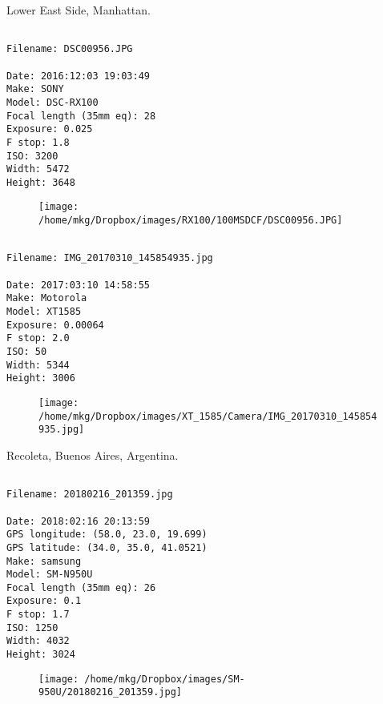 \clearpage
\onecolumn
\noindent Lower East Side, Manhattan.
\noindent
\begin{lstlisting}

Filename: DSC00956.JPG

Date: 2016:12:03 19:03:49
Make: SONY
Model: DSC-RX100
Focal length (35mm eq): 28
Exposure: 0.025
F stop: 1.8
ISO: 3200
Width: 5472
Height: 3648
\end{lstlisting}
\clearpage

\begin{figure}
\texttt{[image: /home/mkg/Dropbox/images/RX100/100MSDCF/DSC00956.JPG]}
\end{figure}
    
\clearpage
\onecolumn
\noindent 
\noindent
\begin{lstlisting}

Filename: IMG_20170310_145854935.jpg

Date: 2017:03:10 14:58:55
Make: Motorola
Model: XT1585
Exposure: 0.00064
F stop: 2.0
ISO: 50
Width: 5344
Height: 3006
\end{lstlisting}
\clearpage

\begin{figure}
\texttt{[image: /home/mkg/Dropbox/images/XT\_1585/Camera/IMG\_20170310\_145854935.jpg]}
\end{figure}
    
\clearpage
\onecolumn
\noindent Recoleta, Buenos Aires, Argentina.
\noindent
\begin{lstlisting}

Filename: 20180216_201359.jpg

Date: 2018:02:16 20:13:59
GPS longitude: (58.0, 23.0, 19.699)
GPS latitude: (34.0, 35.0, 41.0521)
Make: samsung
Model: SM-N950U
Focal length (35mm eq): 26
Exposure: 0.1
F stop: 1.7
ISO: 1250
Width: 4032
Height: 3024
\end{lstlisting}
\clearpage

\begin{figure}
\texttt{[image: /home/mkg/Dropbox/images/SM-950U/20180216\_201359.jpg]}
\end{figure}
    
